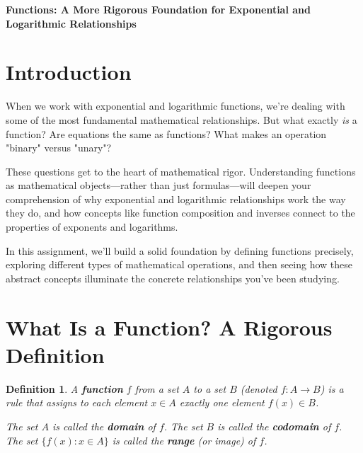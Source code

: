 \documentclass[12pt]{article}
\newtheorem{definition}{Definition}
\begin{document}
\begin{center}
\textbf{\Large Functions: A More Rigorous Foundation for Exponential and Logarithmic Relationships} \\
\vspace{0.5cm}
\hspace{0.1\textwidth}
\end{center}

\vspace{0.5cm}

\section{Introduction}

When we work with exponential and logarithmic functions, we're dealing with some of the most fundamental mathematical relationships. But what exactly \textit{is} a function? Are equations the same as functions? What makes an operation "binary" versus "unary"? 

These questions get to the heart of mathematical rigor. Understanding functions as mathematical objects—rather than just formulas—will deepen your comprehension of why exponential and logarithmic relationships work the way they do, and how concepts like function composition and inverses connect to the properties of exponents and logarithms.

In this assignment, we'll build a solid foundation by defining functions precisely, exploring different types of mathematical operations, and then seeing how these abstract concepts illuminate the concrete relationships you've been studying.

\section{What Is a Function? A Rigorous Definition}

\begin{definition}
A \textbf{function} $f$ from a set $A$ to a set $B$ (denoted $f: A \to B$) is a rule that assigns to each element $x \in A$ exactly one element $f(x) \in B$.

The set $A$ is called the \textbf{domain} of $f$.
The set $B$ is called the \textbf{codomain} of $f$.
The set $\{f(x) : x \in A\}$ is called the \textbf{range} (or image) of $f$.
\end{definition}
\end{document}
